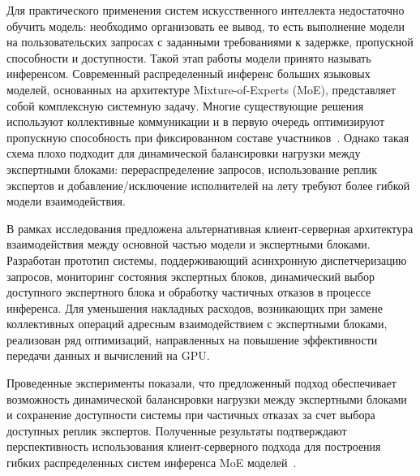 Для практического применения систем искусственного интеллекта недостаточно обучить модель: необходимо организовать ее вывод, то есть выполнение модели на пользовательских запросах с заданными требованиями к задержке, пропускной способности и доступности. Такой этап работы модели принято называть инференсом. Современный распределенный инференс больших языковых моделей, основанных на архитектуре Mixture-of-Experts (MoE), представляет собой комплексную системную задачу. Многие существующие решения используют коллективные коммуникации и в первую очередь оптимизируют пропускную способность при фиксированном составе участников~\cite{aminabadi2022deepspeed,deepseekDeepEP}. Однако такая схема плохо подходит для динамической балансировки нагрузки между экспертными блоками: перераспределение запросов, использование реплик экспертов и добавление/исключение исполнителей на лету требуют более гибкой модели взаимодействия.

В рамках исследования предложена альтернативная клиент-серверная архитектура взаимодействия между основной частью модели и экспертными блоками. Разработан прототип системы, поддерживающий асинхронную диспетчеризацию запросов, мониторинг состояния экспертных блоков, динамический выбор доступного экспертного блока и обработку частичных отказов в процессе инференса. Для уменьшения накладных расходов, возникающих при замене коллективных операций адресным взаимодействием с экспертными блоками, реализован ряд оптимизаций, направленных на повышение эффективности передачи данных и вычислений на GPU.

Проведенные эксперименты показали, что предложенный подход обеспечивает возможность динамической балансировки нагрузки между экспертными блоками и сохранение доступности системы при частичных отказах за счет выбора доступных реплик экспертов. Полученные результаты подтверждают перспективность использования клиент-серверного подхода для построения гибких распределенных систем инференса MoE моделей~\cite{shazeer2017moe,deepseekDeepEP}.
